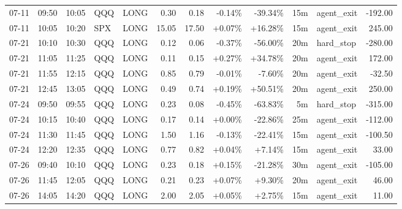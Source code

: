 \documentclass[11pt,a4paper]{article}
\begin{document}
\begin{center}
\begin{longtable}{>{\color{txtmain}}l l l l l r r r r r >{\color{txtmain}}l r}
07-11 & 09:50 & 10:05 & QQQ & LONG & 0.30 & 0.18 & \textcolor{lossred}{-0.14\%} & \textcolor{lossred}{-39.34\%} & 15m & agent\_exit & \textcolor{lossred}{-192.00} \\
07-11 & 10:05 & 10:20 & SPX & LONG & 15.05 & 17.50 & \textcolor{wingreen}{+0.07\%} & \textcolor{wingreen}{+16.28\%} & 15m & agent\_exit & \textcolor{wingreen}{245.00} \\
07-21 & 10:10 & 10:30 & QQQ & LONG & 0.12 & 0.06 & \textcolor{lossred}{-0.37\%} & \textcolor{lossred}{-56.00\%} & 20m & hard\_stop & \textcolor{lossred}{-280.00} \\
07-21 & 11:05 & 11:25 & QQQ & LONG & 0.11 & 0.15 & \textcolor{wingreen}{+0.27\%} & \textcolor{wingreen}{+34.78\%} & 20m & agent\_exit & \textcolor{wingreen}{172.00} \\
07-21 & 11:55 & 12:15 & QQQ & LONG & 0.85 & 0.79 & \textcolor{lossred}{-0.01\%} & \textcolor{lossred}{-7.60\%} & 20m & agent\_exit & \textcolor{lossred}{-32.50} \\
07-21 & 12:45 & 13:05 & QQQ & LONG & 0.49 & 0.74 & \textcolor{wingreen}{+0.19\%} & \textcolor{wingreen}{+50.51\%} & 20m & agent\_exit & \textcolor{wingreen}{250.00} \\
07-24 & 09:50 & 09:55 & QQQ & LONG & 0.23 & 0.08 & \textcolor{lossred}{-0.45\%} & \textcolor{lossred}{-63.83\%} & 5m & hard\_stop & \textcolor{lossred}{-315.00} \\
07-24 & 10:15 & 10:40 & QQQ & LONG & 0.17 & 0.14 & \textcolor{wingreen}{+0.00\%} & \textcolor{lossred}{-22.86\%} & 25m & agent\_exit & \textcolor{lossred}{-112.00} \\
07-24 & 11:30 & 11:45 & QQQ & LONG & 1.50 & 1.16 & \textcolor{lossred}{-0.13\%} & \textcolor{lossred}{-22.41\%} & 15m & agent\_exit & \textcolor{lossred}{-100.50} \\
07-24 & 12:20 & 12:35 & QQQ & LONG & 0.77 & 0.82 & \textcolor{wingreen}{+0.04\%} & \textcolor{wingreen}{+7.14\%} & 15m & agent\_exit & \textcolor{wingreen}{33.00} \\
07-26 & 09:40 & 10:10 & QQQ & LONG & 0.23 & 0.18 & \textcolor{wingreen}{+0.15\%} & \textcolor{lossred}{-21.28\%} & 30m & agent\_exit & \textcolor{lossred}{-105.00} \\
07-26 & 11:45 & 12:05 & QQQ & LONG & 0.21 & 0.23 & \textcolor{wingreen}{+0.07\%} & \textcolor{wingreen}{+9.30\%} & 20m & agent\_exit & \textcolor{wingreen}{46.00} \\
07-26 & 14:05 & 14:20 & QQQ & LONG & 2.00 & 2.05 & \textcolor{wingreen}{+0.05\%} & \textcolor{wingreen}{+2.75\%} & 15m & agent\_exit & \textcolor{wingreen}{11.00} \\

\end{longtable}
\end{center}
\end{document}
